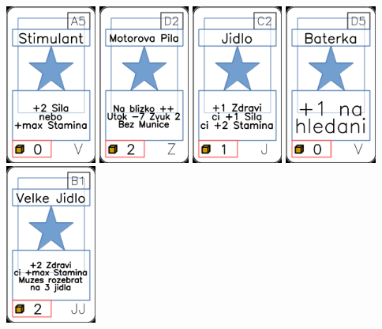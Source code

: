 \documentclass[a4paper]{article}
\begin{document}
	\includegraphics[width=3.0cm]{img-1_64}
	\includegraphics[width=3.0cm]{img-1_106}
	\includegraphics[width=3.0cm]{img-1_11}
	\includegraphics[width=3.0cm]{img-1_79}
	\includegraphics[width=3.0cm]{img-1_35}
\end{document}
